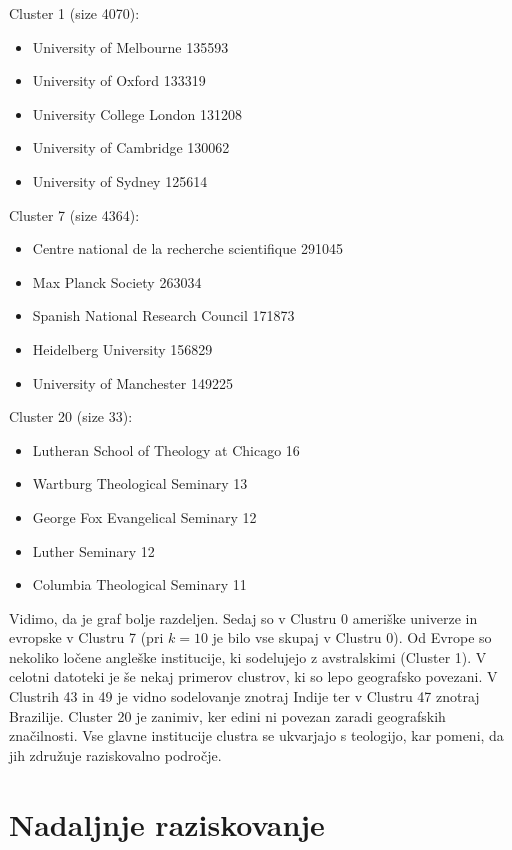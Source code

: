 \documentclass[a4paper,12pt]{article}
\begin{document}
	\pagebreak
	
	Cluster 1 (size 4070):
	\begin{itemize}
		\item University of Melbourne 135593
		\item University of Oxford 133319
		\item University College London 131208
		\item University of Cambridge 130062
		\item University of Sydney 125614
	\end{itemize}
	
	\hspace{1cm}
	
	Cluster 7 (size 4364):
	\begin{itemize}
		\item Centre national de la recherche scientifique 291045
		\item Max Planck Society 263034
		\item Spanish National Research Council 171873
		\item Heidelberg University 156829
		\item University of Manchester 149225
	\end{itemize}

	Cluster 20 (size 33):
	\begin{itemize}
		\item Lutheran School of Theology at Chicago 16
		\item Wartburg Theological Seminary 13
		\item George Fox Evangelical Seminary 12
		\item Luther Seminary 12
		\item Columbia Theological Seminary 11
	\end{itemize}


	Vidimo, da je graf bolje razdeljen. Sedaj so v Clustru 0 ameriške univerze in evropske v Clustru 7 (pri $k=10$ je bilo vse skupaj v Clustru 0). Od Evrope so nekoliko ločene angleške institucije, ki sodelujejo z avstralskimi (Cluster 1). V celotni datoteki je še nekaj primerov clustrov, ki so lepo geografsko povezani. V Clustrih 43 in 49 je vidno sodelovanje znotraj Indije ter v Clustru 47 znotraj Brazilije. Cluster 20 je zanimiv, ker edini ni povezan zaradi geografskih značilnosti. Vse glavne institucije clustra se ukvarjajo s teologijo, kar pomeni, da jih združuje raziskovalno področje. 
	
	\section{Nadaljnje raziskovanje}
	
\end{document}
